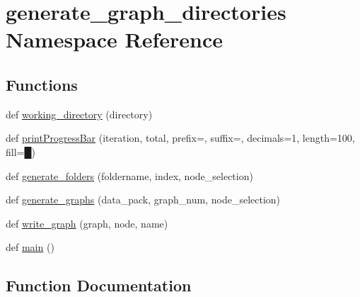 \hypertarget{namespacegenerate__graph__directories}{}\section{generate\+\_\+graph\+\_\+directories Namespace Reference}
\label{namespacegenerate__graph__directories}
\subsection*{Functions}
\begin{DoxyCompactItemize}
\item 
def \hyperlink{namespacegenerate__graph__directories_a4de5ee502ec92aaea6af6d143f913893_a4de5ee502ec92aaea6af6d143f913893}{working\+\_\+directory} (directory)
\item 
def \hyperlink{namespacegenerate__graph__directories_a8743ea193c5226788a5fc44c0ed83027_a8743ea193c5226788a5fc44c0ed83027}{print\+Progress\+Bar} (iteration, total, prefix=\textquotesingle{}\textquotesingle{}, suffix=\textquotesingle{}\textquotesingle{}, decimals=1, length=100, fill=\textquotesingle{}█\textquotesingle{})
\item 
def \hyperlink{namespacegenerate__graph__directories_a849668a185378079e4ff7a774599ba9e_a849668a185378079e4ff7a774599ba9e}{generate\+\_\+folders} (foldername, index, node\+\_\+selection)
\item 
def \hyperlink{namespacegenerate__graph__directories_ae23e1312dfaf38532e06d36b044dceb2_ae23e1312dfaf38532e06d36b044dceb2}{generate\+\_\+graphs} (data\+\_\+pack, graph\+\_\+num, node\+\_\+selection)
\item 
def \hyperlink{namespacegenerate__graph__directories_ab9f0035540a4fa069e1077bc1eb8e419_ab9f0035540a4fa069e1077bc1eb8e419}{write\+\_\+graph} (graph, node, name)
\item 
def \hyperlink{namespacegenerate__graph__directories_a795922cdebd688d258a7363909b257bc_a795922cdebd688d258a7363909b257bc}{main} ()
\end{DoxyCompactItemize}


\subsection{Function Documentation}
\mbox{\label{namespacegenerate__graph__directories_a849668a185378079e4ff7a774599ba9e_a849668a185378079e4ff7a774599ba9e}} 
